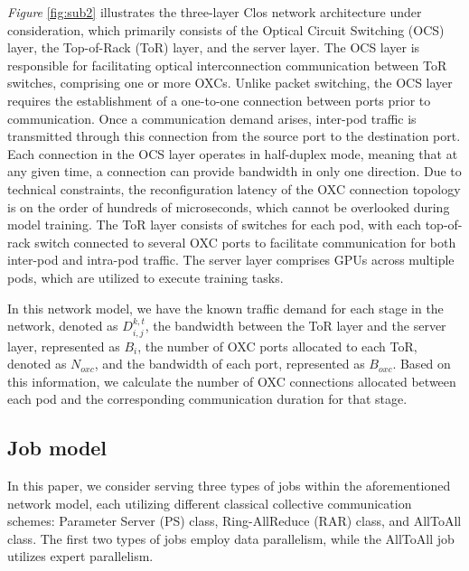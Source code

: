\documentclass[conference]{IEEEtran}
\begin{document}
\emph{Figure} \ref{fig:sub2} illustrates the three-layer Clos network architecture under consideration, which primarily consists of the Optical Circuit Switching (OCS) layer, the Top-of-Rack (ToR) layer, and the server layer. The OCS layer is responsible for facilitating optical interconnection communication between ToR switches, comprising one or more OXCs. Unlike packet switching, the OCS layer requires the establishment of a one-to-one connection between ports prior to communication. Once a communication demand arises, inter-pod traffic is transmitted through this connection from the source port to the destination port. Each connection in the OCS layer operates in half-duplex mode, meaning that at any given time, a connection can provide bandwidth in only one direction. Due to technical constraints, the reconfiguration latency of the OXC connection topology is on the order of hundreds of microseconds, which cannot be overlooked during model training. The ToR layer consists of switches for each pod, with each top-of-rack switch connected to several OXC ports to facilitate communication for both inter-pod and intra-pod traffic. The server layer comprises GPUs across multiple pods, which are utilized to execute training tasks.


In this network model, we have the known traffic demand for each stage in the network, denoted as \( D_{i,j}^{k,t} \), the bandwidth between the ToR layer and the server layer, represented as \( B_{i} \), the number of OXC ports allocated to each ToR, denoted as \( N_{oxc} \), and the bandwidth of each port, represented as \( B_{oxc} \). Based on this information, we calculate the number of OXC connections allocated between each pod and the corresponding communication duration for that stage.

\subsection{Job model}

In this paper, we consider serving three types of jobs within the aforementioned network model, each utilizing different classical collective communication schemes: Parameter Server (PS) class, Ring-AllReduce (RAR) class, and AllToAll class. The first two types of jobs employ data parallelism, while the AllToAll job utilizes expert parallelism.
\end{document}
